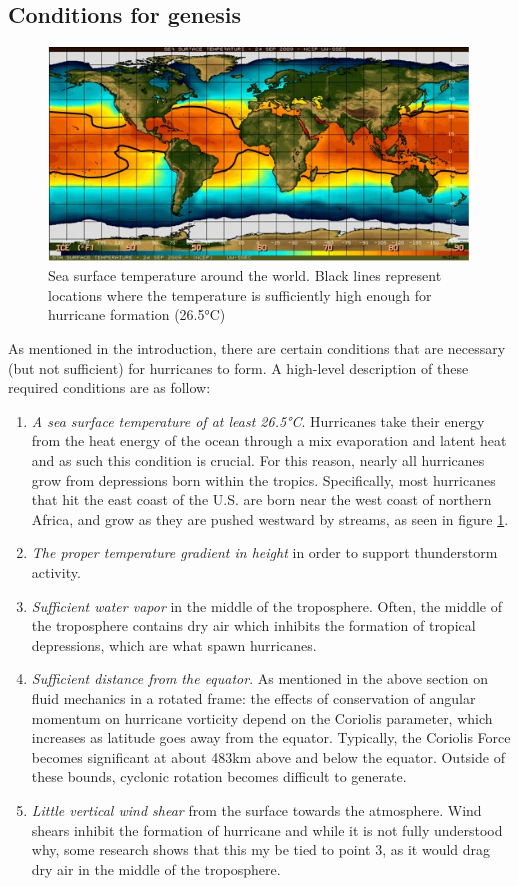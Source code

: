 \subsection{Conditions for genesis}
\begin{figure}
    \centering
    \includegraphics[width=0.7\linewidth]{assets/SSTforGlobalOcean1.jpg}
    \caption{Sea surface temperature around the world. Black lines represent locations where the temperature is sufficiently high enough for hurricane formation (26.5°C)}
    \label{fig:temp}
\end{figure}
As mentioned in the introduction, there are certain conditions that are necessary (but not sufficient) for hurricanes to form. A high-level description of these required conditions are as follow:
\begin{enumerate}
    \item \textit{A sea surface temperature of at least 26.5°C}. Hurricanes take their energy from the heat energy of the ocean through a mix evaporation and latent heat and as such this condition is crucial. For this reason, nearly all hurricanes grow from depressions born within the tropics. Specifically, most hurricanes that hit the east coast of the U.S. are born near the west coast of northern Africa, and grow as they are pushed westward by streams, as seen in figure \ref{fig:temp}. \cite{develop}
    \item \textit{The proper temperature gradient in height} in order to support thunderstorm activity. \cite{develop}
    \item \textit{Sufficient water vapor} in the middle of the troposphere. Often, the middle of the troposphere contains dry air which inhibits the formation of tropical depressions, which are what spawn hurricanes. \cite{develop}
    \item \textit{Sufficient distance from the equator}. As mentioned in the above section on fluid mechanics in a rotated frame: the effects of conservation of angular momentum on hurricane vorticity depend on the Coriolis parameter, which increases as latitude goes away from the equator. Typically, the Coriolis Force becomes significant at about 483km above and below the equator. Outside of these bounds, cyclonic rotation becomes difficult to generate. \cite{develop}
    \item \textit{Little vertical wind shear} from the surface towards the atmosphere. Wind shears inhibit the formation of hurricane and while it is not fully understood why, some research shows that this my be tied to point 3, as it would drag dry air in the middle of the troposphere.
\end{enumerate}


